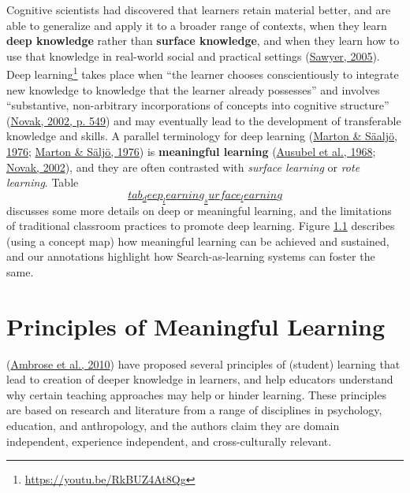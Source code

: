 \documentclass[a4paper, nobind]{templates/ociamthesis}
\begin{document}
Cognitive scientists had discovered that learners retain material
better, and are able to generalize and apply it to a broader range of
contexts, when they learn \textbf{deep knowledge} rather than \textbf{surface
knowledge}, and when they learn how to use that knowledge in real-world
social and practical settings (\protect\hyperlink{ref-sawyer2005cambridge}{Sawyer, 2005}). Deep learning\footnote{\url{https://youtu.be/RkBUZ4At8Qg}}
takes place when ``the learner chooses conscientiously to integrate new
knowledge to knowledge that the learner already possesses'' and involves
``substantive, non-arbitrary incorporations of concepts into cognitive
structure'' (\protect\hyperlink{ref-novak2002meaningful}{Novak, 2002, p. 549}) and may eventually lead to the
development of transferable knowledge and skills. A parallel terminology
for deep learning (\protect\hyperlink{ref-marton1976qualitative_b}{Marton \& Säaljö, 1976}; \protect\hyperlink{ref-marton1976qualitative_a}{Marton \& Säljö, 1976})
is \textbf{meaningful learning}
(\protect\hyperlink{ref-ausubel1968educational}{Ausubel et al., 1968}; \protect\hyperlink{ref-novak2002meaningful}{Novak, 2002}), and they are often
contrasted with \emph{surface learning} or \emph{rote learning}. Table
\protect\hyperlink{tab_deep_learning_surface_learning}{\[tab_deep_learning_surface_learning\]} discusses some more
details on deep or meaningful learning, and the limitations of
traditional classroom practices to promote deep learning. Figure
\protect\hyperlink{fig_meaningful_learning}{1.1} describes (using a concept map) how
meaningful learning can be achieved and sustained, and our annotations
highlight how Search-as-learning systems can foster the same.

\hypertarget{sec:bg_learn_principles}{%
\section{Principles of Meaningful Learning}\label{sec:bg_learn_principles}}

(\protect\hyperlink{ref-ambrose2010howa}{Ambrose et al., 2010}) have proposed several principles of (student)
learning that lead to creation of deeper knowledge in learners, and help
educators understand why certain teaching approaches may help or hinder
learning. These principles are based on research and literature from a
range of disciplines in psychology, education, and anthropology, and the
authors claim they are domain independent, experience independent, and
cross-culturally relevant.
\end{document}
